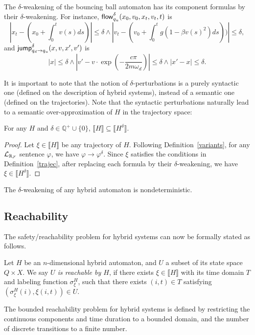 \documentclass[12pt]{article}
\begin{document}
\begin{example}
The $\delta$-weakening of the bouncing ball automaton has its component formulas by their $\delta$-weakening. For instance, $\mathsf{flow}_{q_u}^{\delta}(x_0, v_0, x_t, v_t, t)$ is
$$|x_t - (x_0 + \int_0^{t} v(s) ds)|\leq \delta \wedge |v_t - (v_0 + \int_0^t g(1-\beta v(s)^2) ds))|\leq \delta,$$
and $\mathsf{jump}_{q_d \rightarrow q_u}^{\delta} (x, v, x', v')$ is 
$$|x|\leq \delta \wedge |v' - v\cdot\exp(-\frac{c\pi}{2m\omega_d})|\leq \delta \wedge |x'-x|\leq \delta.$$
\end{example}

It is important to note that the notion of $\delta$-perturbations is a purely syntactic one (defined on the description of hybrid systems), instead of a semantic one (defined on the trajectories). Note that the syntactic perturbations naturally lead to a semantic over-approximation of $H$ in the trajectory space:
\begin{proposition} For any $H$ and $\delta\in\mathbb{Q}^+\cup\{0\}$, $\llbracket H\rrbracket\subseteq \llbracket H^{\delta}\rrbracket.$
\end{proposition}
\begin{proof}
Let $\xi\in \llbracket H\rrbracket$ be any trajectory of $H$. Following
Definition~\ref{variants}, for any $\mathcal{L}_{\mathbb{R}_{\mathcal{F}}}$ sentence $\varphi$, we have
$\varphi\rightarrow\varphi^{\delta}$. Since
$\xi$ satisfies the conditions in Definition~\ref{trajec}, after replacing each
formula by their $\delta$-weakening, we have $\xi\in \llbracket H^{\delta}\rrbracket$.
\end{proof}

\begin{proposition}
The $\delta$-weakening of any hybrid automaton is nondeterministic.
\end{proposition}


\subsection{Reachability}


The safety/reachability problem for hybrid systems can now be formally stated as follows.

\begin{definition}[Reachability]\label{reachability}
Let $H$ be an $n$-dimensional hybrid automaton, and $U$ a subset of its state
space $Q\times X$.  We say {\em $U$ is reachable by $H$}, if there exists
$\xi\in\llbracket
H \rrbracket$ with its time domain $T$ and labeling function
$\sigma_{\xi}^H$, such that there exists $(i,t)\in T$ satisfying
$(\sigma^H_{\xi}(i), \xi(i,t))\in U.$
\end{definition}
The bounded reachability problem for hybrid systems is defined by restricting
the continuous components and time duration to a bounded domain, and the number
of discrete transitions to a finite number.
\end{document}
